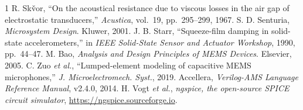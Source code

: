\documentclass[conference]{IEEEtran}
\begin{document}
\begin{thebibliography}{1}
\footnotesize
{} R. Sk\v{v}or, ``On the acoustical resistance due to viscous
losses in the air gap of electrostatic transducers,'' \emph{Acustica},
vol.~19, pp.~295--299, 1967.
 S. D. Senturia, \emph{Microsystem Design}. Kluwer, 2001.
 J. B. Starr, ``Squeeze-film damping in solid-state
accelerometers,'' in \emph{IEEE Solid-State Sensor and Actuator Workshop},
1990, pp.~44--47.
 M. Bao, \emph{Analysis and Design Principles of MEMS Devices}.
Elsevier, 2005.
 C. Zuo \emph{et al.}, ``Lumped-element modeling of capacitive MEMS
microphones,'' \emph{J. Microelectromech. Syst.}, 2019.
 Accellera, \emph{Verilog-AMS Language Reference Manual},
v2.4.0, 2014.
 H. Vogt \emph{et al.}, \emph{ngspice, the open-source SPICE
circuit simulator}, \url{https://ngspice.sourceforge.io}.
\end{thebibliography}
\end{document}
